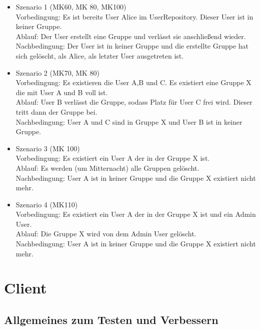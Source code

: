 \documentclass[a4paper]{scrreprt}
\begin{document}
\begin{itemize}

\item Szenario 1 (MK60, MK 80, MK100)\\
Vorbedingung: Es ist bereits User Alice im UserRepository. Dieser User ist in keiner Gruppe.\\
Ablauf: Der User erstellt eine Gruppe und verlässt sie anschließend wieder.\\
Nachbedingung: Der User ist in keiner Gruppe und die erstellte Gruppe hat sich gelöscht, als Alice, als letzter User ausgetreten ist.\\


\item Szenario 2 (MK70, MK 80)\\
Vorbedingung: Es existieren die User A,B und C. Es existiert eine Gruppe X die mit User A und B voll ist. \\
Ablauf: User B verlässt die Gruppe, sodass Platz für User C frei wird. Dieser tritt dann der Gruppe bei.\\
Nachbedingung: User A und C sind in Gruppe X und User B ist in keiner Gruppe.\\


\item Szenario 3 (MK 100)\\
Vorbedingung: Es existiert ein User A der in der Gruppe X ist.\\
Ablauf: Es werden (um Mitternacht) alle Gruppen gelöscht.\\
Nachbedingung: User A  ist in keiner Gruppe und die Gruppe X existiert nicht mehr.\\

\item Szenario 4 (MK110)\\
Vorbedingung: Es existiert ein User A der in der Gruppe X ist und ein Admin User.\\
Ablauf: Die Gruppe X wird von dem Admin User gelöscht.\\
Nachbedingung: User A  ist in keiner Gruppe und die Gruppe X existiert nicht mehr.\\


\end{itemize}

\chapter{Client}

\section{Allgemeines zum Testen und Verbessern}
\end{document}
